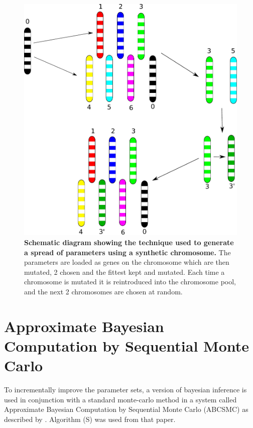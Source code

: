 \begin{figure}
\begin{center}
\includegraphics[width=14cm]{./03-parameterestimationmethodologies/data/sa_spread.pdf}
\end{center}
\caption{{\bf Schematic diagram showing the technique used to generate a spread of parameters using a synthetic chromosome.} The parameters are loaded as genes on the chromosome which are then mutated, 2 chosen and the fittest kept and mutated. Each time a chromosome is mutated it is reintroduced into the chromosome pool, and the next 2 chromosomes are chosen at random.
\label{fig:sa_spread}}
\end{figure} 





\section{Approximate Bayesian Computation by Sequential Monte Carlo}

To incrementally improve the parameter sets, a version of bayesian inference is used in conjunction with a standard monte-carlo method in a system called Approximate Bayesian Computation by Sequential Monte Carlo (ABCSMC) as described by \citet{Toni2009}. Algorithm (S) was used from that paper.

